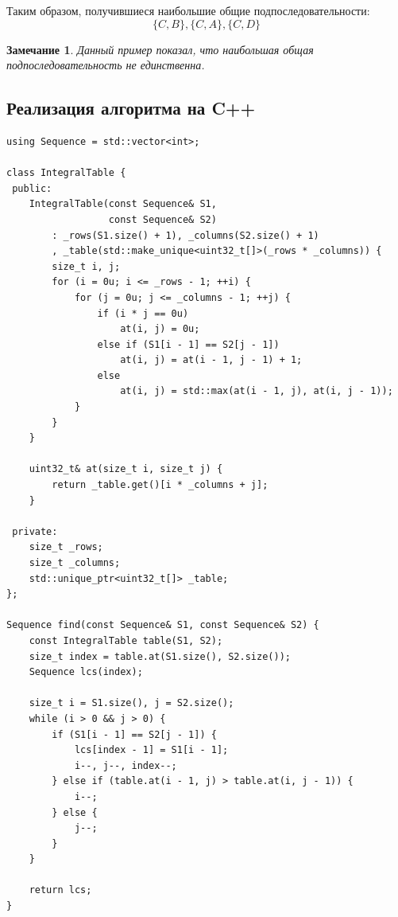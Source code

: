 \documentclass[12pt]{article}
\newtheorem*{remark}{Замечание}
\begin{document}
\begin{center}
    \end{center}

    Таким образом, получившиеся наибольшие общие подпоследовательности:
    $$\{C, B\}, \{C, A\}, \{C, D\}$$
    \begin{remark}
        Данный пример показал, что наибольшая общая подпоследовательность
        не единственна.
    \end{remark}

\newpage
\subsection{Реализация алгоритма на C++}
\begin{lstlisting}
using Sequence = std::vector<int>;

class IntegralTable {
 public:
    IntegralTable(const Sequence& S1,
                  const Sequence& S2)
        : _rows(S1.size() + 1), _columns(S2.size() + 1)
        , _table(std::make_unique<uint32_t[]>(_rows * _columns)) {
        size_t i, j;
        for (i = 0u; i <= _rows - 1; ++i) {
            for (j = 0u; j <= _columns - 1; ++j) {
                if (i * j == 0u)
                    at(i, j) = 0u;
                else if (S1[i - 1] == S2[j - 1])
                    at(i, j) = at(i - 1, j - 1) + 1;
                else
                    at(i, j) = std::max(at(i - 1, j), at(i, j - 1));
            }
        }
    }

    uint32_t& at(size_t i, size_t j) {
        return _table.get()[i * _columns + j];
    }

 private:
    size_t _rows;
    size_t _columns;
    std::unique_ptr<uint32_t[]> _table;
};

Sequence find(const Sequence& S1, const Sequence& S2) {
    const IntegralTable table(S1, S2);
    size_t index = table.at(S1.size(), S2.size());
    Sequence lcs(index);

    size_t i = S1.size(), j = S2.size();
    while (i > 0 && j > 0) {
        if (S1[i - 1] == S2[j - 1]) {
            lcs[index - 1] = S1[i - 1];
            i--, j--, index--;
        } else if (table.at(i - 1, j) > table.at(i, j - 1)) {
            i--;
        } else {
            j--;
        }
    }

    return lcs;
}
\end{lstlisting}
\end{document}
